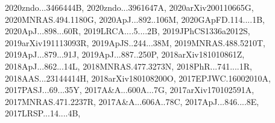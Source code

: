 \documentclass[12pt]{article}
\begin{document}
{2020zndo...3466444B,%
2020zndo...3961647A,%
2020arXiv200110665G,%
2020MNRAS.494.1180G,%
2020ApJ...892..106M,%
2020GApFD.114....1B,%
2020ApJ...898...60R,%
2019LRCA....5....2B,%
2019JPhCS1336a2012S,%
2019arXiv191113093R,%
2019ApJS..244...38M,%
2019MNRAS.488.5210T,%
2019ApJ...879...91J,%
2019ApJ...887..250P,%
2018arXiv181010861Z,%
2018ApJ...862...14L,%
2018MNRAS.477.3273N,%
2018PhR...741....1R,%
2018AAS...23144414H,%
2018arXiv180108200O,%
2017EPJWC.16002010A,%
2017PASJ...69...35Y,%
2017A&A...600A...7G,%
2017arXiv170102591A,%
2017MNRAS.471.2237R,%
2017A&A...606A..78C,%
2017ApJ...846....8E,%
2017LRSP...14....4B,%
}
\end{document}

